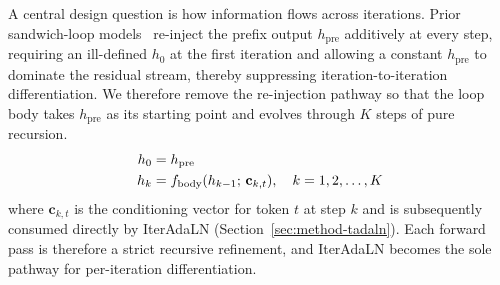 
A central design question is how information flows across iterations. Prior sandwich-loop models~\cite{mcleish2025teaching,geiping2026scaling} re-inject the prefix output $h_{\text{pre}}$ additively at every step, requiring an ill-defined $h_0$ at the first iteration and allowing a constant $h_{\text{pre}}$ to dominate the residual stream, thereby suppressing iteration-to-iteration differentiation. We therefore remove the re-injection pathway so that the loop body takes $h_{\text{pre}}$ as its starting point and evolves through $K$ steps of pure recursion.
\begin{align}
\small
  h_0 &= h_{\text{pre}} \label{eq:loop-init} \\
  h_k &= f_{\mathrm{body}}(h_{k-1};\,\mathbf{c}_{k,t}), \quad k = 1, 2, \dots, K
  \label{eq:pure-recursion}
\end{align}
where $\mathbf{c}_{k,t}$ is the conditioning vector for token $t$ at step $k$ and is subsequently consumed directly by IterAdaLN (Section~\ref{sec:method-tadaln}). Each forward pass is therefore a strict recursive refinement, and IterAdaLN becomes the sole pathway for per-iteration differentiation.

